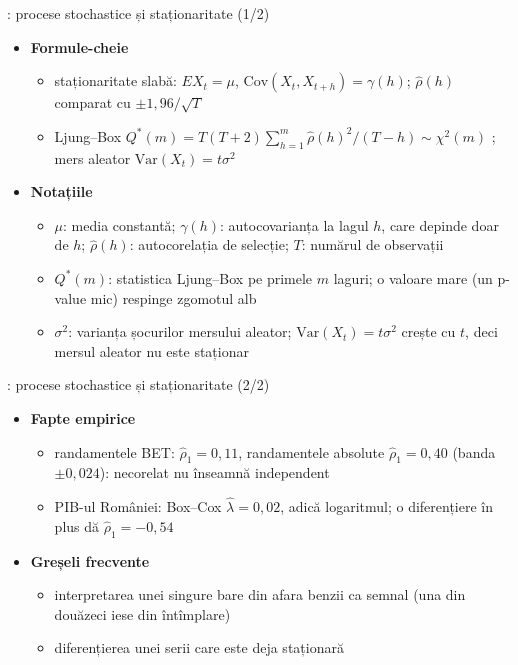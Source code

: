\begin{frame}{: procese stochastice și staționaritate (1/2)}
\itemsize{\footnotesize}
\begin{itemize}
    \item \textbf{Formule-cheie}
    \begin{itemize}
        \item staționaritate slabă: $E X_t = \mu$, $\mathrm{Cov}(X_t, X_{t+h}) = \gamma(h)$; $\hat\rho(h)$ comparat cu $\pm 1{,}96/\sqrt{T}$
        \item Ljung--Box $Q^*(m) = T(T + 2)\sum_{h=1}^{m}\hat\rho(h)^2/(T - h) \sim \chi^2(m)$ ; mers aleator $\mathrm{Var}(X_t) = t\sigma^2$
    \end{itemize}
    \item \textbf{Notațiile}
    \begin{itemize}
        \item $\mu$: media constantă; $\gamma(h)$: autocovarianța la lagul $h$, care depinde doar de $h$; $\hat\rho(h)$: autocorelația de selecție; $T$: numărul de observații
        \item $Q^*(m)$: statistica Ljung--Box pe primele $m$ laguri; o valoare mare (un p-value mic) respinge zgomotul alb
        \item $\sigma^2$: varianța șocurilor mersului aleator; $\mathrm{Var}(X_t) = t\sigma^2$ crește cu $t$, deci mersul aleator nu este staționar
    \end{itemize}
\end{itemize}
\end{frame}

\begin{frame}{: procese stochastice și staționaritate (2/2)}
\itemsize{\footnotesize}
\begin{itemize}
    \item \textbf{Fapte empirice}
    \begin{itemize}
        \item randamentele BET: $\hat\rho_1 = 0{,}11$, randamentele absolute $\hat\rho_1 = 0{,}40$ (banda $\pm 0{,}024$): necorelat nu înseamnă independent
        \item PIB-ul României: Box--Cox $\hat\lambda = 0{,}02$, adică logaritmul; o diferențiere în plus dă $\hat\rho_1 = \ensuremath{-}0{,}54$
    \end{itemize}
    \item \textbf{Greșeli frecvente}
    \begin{itemize}
        \item interpretarea unei singure bare din afara benzii ca semnal (una din douăzeci iese din întîmplare)
        \item diferențierea unei serii care este deja staționară
    \end{itemize}
\end{itemize}
\end{frame}

